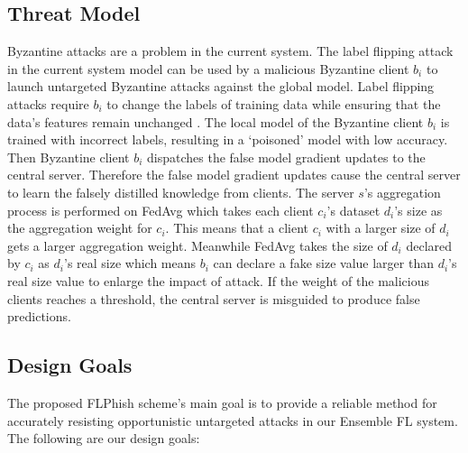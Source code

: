 \documentclass[journal]{IEEEtran}
\begin{document}
\subsection{Threat Model}
Byzantine attacks are a problem in the current system. The label flipping attack in the current system model can be used by a malicious Byzantine client $b_i$ to launch untargeted Byzantine attacks against the global model. Label flipping attacks require $b_i$ to change the labels of training data while ensuring that the data's features remain unchanged \cite{ref_18_label_flipping}. The local model of the Byzantine client $b_i$ is trained with incorrect labels, resulting in a `poisoned' model with low accuracy. Then Byzantine client $b_{i}$ dispatches the false model gradient updates to the central server. Therefore the false model gradient updates cause the central server to learn the falsely distilled knowledge from clients. The server $s$'s aggregation process is performed on FedAvg which takes each client $c_{i}$'s dataset $d_{i}$'s size as the aggregation weight for $c_{i}$. This means that a client $c_{i}$ with a larger size of $d_{i}$ gets a larger aggregation weight. Meanwhile FedAvg takes the size of $d_{i}$ declared by $c_{i}$ as $d_{i}$'s real size which means $b_{i}$ can declare a fake size value larger than $d_{i}$'s real size value to enlarge the impact of attack. If the weight of the malicious clients reaches a threshold, the central server is misguided to produce false predictions.


\subsection{Design Goals}
The proposed FLPhish scheme's main goal is to provide a reliable method for accurately resisting opportunistic untargeted attacks in our Ensemble FL system. The following are our design goals:
\end{document}
